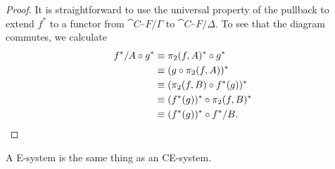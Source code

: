 \begin{proof}
It is straightforward to use the universal property of the pullback to extend
$f^\ast$ to a functor from $\cat{C}_\cat{F}/\Gamma$ to $\cat{C}_\cat{F}/\Delta$.
To see that the diagram commutes, we calculate
\begin{align*}
f^\ast/A\circ g^\ast
& \equiv
\pi_2(f,A)^\ast\circ g^\ast \\
& \equiv
(g\circ\pi_2(f,A))^\ast \\
& \equiv
(\pi_2(f,B)\circ f^\ast(g))^\ast \\
& \equiv
(f^\ast(g))^\ast\circ\pi_2(f,B)^\ast \\
& \equiv
(f^\ast(g))^\ast\circ f^\ast/B.\qedhere
\end{align*}
\end{proof}

\begin{thm}
A E-system is the same thing as an CE-system.
\end{thm}

